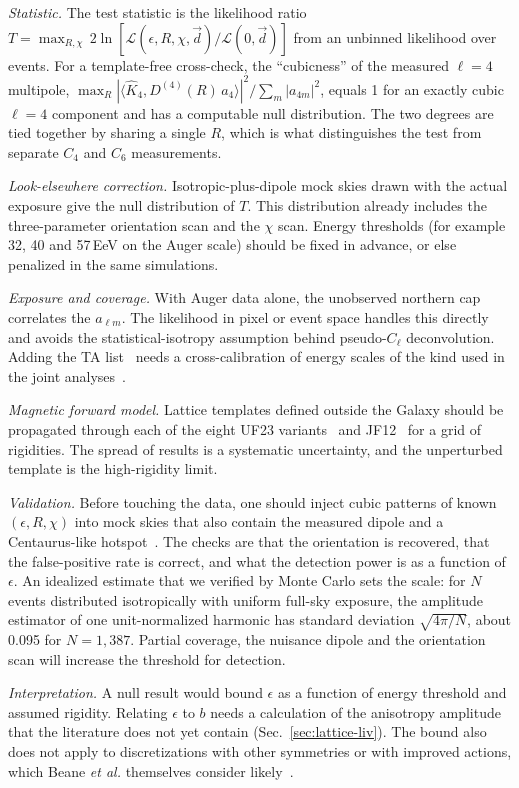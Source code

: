 \emph{Statistic.} The test statistic is the likelihood ratio
$T=\max_{R,\chi}\,2\ln[\mathcal L(\epsilon,R,\chi,\vec d)/\mathcal L(0,\vec d)]$
from an unbinned likelihood over events. For a template-free cross-check, the
``cubicness'' of the measured $\ell=4$ multipole, $\max_R|\langle\hat K_4,
D^{(4)}(R)\,a_4\rangle|^2/\sum_m|a_{4m}|^2$, equals 1 for an exactly cubic
$\ell=4$ component and has a computable null distribution. The two degrees are
tied together by sharing a single $R$, which is what distinguishes the test
from separate $C_4$ and $C_6$ measurements.

\emph{Look-elsewhere correction.} Isotropic-plus-dipole mock skies drawn with
the actual exposure give the null distribution of $T$. This distribution already
includes the three-parameter orientation scan and the $\chi$ scan. Energy
thresholds (for example 32, 40 and 57\,EeV on the Auger scale) should be fixed
in advance, or else penalized in the same simulations.

\emph{Exposure and coverage.} With Auger data alone, the unobserved northern
cap correlates the $a_{\ell m}$. The likelihood in pixel or event space handles
this directly and avoids the statistical-isotropy assumption behind pseudo-$C_\ell$
deconvolution. Adding the TA list~\cite{TelescopeArray2014indications} needs a
cross-calibration of energy scales of the kind used in the joint
analyses~\cite{PierreAugerTA2014searches,PierreAugerTA2025new}.

\emph{Magnetic forward model.} Lattice templates defined outside the Galaxy
should be propagated through each of the eight UF23 variants~\cite{Unger2024coherent}
and JF12~\cite{Jansson2012new} for a grid of rigidities. The spread of results
is a systematic uncertainty, and the unperturbed template is the
high-rigidity limit.

\emph{Validation.} Before touching the data, one should inject cubic patterns
of known $(\epsilon,R,\chi)$ into mock skies that also contain the measured
dipole and a Centaurus-like hotspot~\cite{PierreAuger2022arrival}. The checks
are that the orientation is recovered, that the false-positive rate is correct,
and what the detection power is as a function of $\epsilon$. An idealized
estimate that we verified by Monte Carlo sets the scale: for $N$ events
distributed isotropically with uniform full-sky exposure, the amplitude
estimator of one unit-normalized harmonic has standard deviation
$\sqrt{4\pi/N}$, about 0.095 for $N=1{,}387$. Partial coverage, the nuisance
dipole and the orientation scan will increase the threshold for detection.

\emph{Interpretation.} A null result would bound $\epsilon$ as a function of
energy threshold and assumed rigidity. Relating $\epsilon$ to $b$ needs a
calculation of the anisotropy amplitude that the literature does not yet
contain (Sec.~\ref{sec:lattice-liv}). The bound also does not apply to
discretizations with other symmetries or with improved actions, which Beane
\emph{et al.} themselves consider likely~\cite{Beane2014constraints}.
